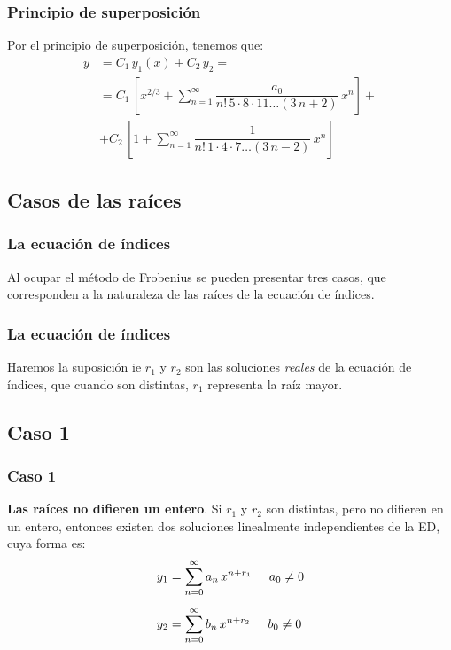 \begin{frame}
\frametitle{Principio de superposición}
Por el principio de superposición, tenemos que:
\begin{align*}
y &= C_{1} \, y_{1} (x) + C_{2} \, y_{2} = \\[0.5em]
&= C_{1} \, \left[ x^{2/3} + \sum_{n=1}^{\infty} \dfrac{a_{0}}{n! \, 5 \cdot 8 \cdot 11 \ldots (3\, n + 2)} \, x^{n} \right] + \\[0.5em]
&+ C_{2} \, \left[ 1 + \sum_{n=1}^{\infty} \dfrac{1}{n! \, 1 \cdot 4 \cdot 7 \ldots (3\, n - 2)} \, x^{n} \right]
\end{align*}
\end{frame}
\subsection{Casos de las raíces}
\begin{frame}
\frametitle{La ecuación de índices}
Al ocupar el método de Frobenius se pueden presentar tres casos, que corresponden a la naturaleza de las raíces de la ecuación de índices.
\end{frame}
\begin{frame}
\frametitle{La ecuación de índices}
Haremos la suposición ie $r_{1}$ y $r_{2}$ son las soluciones \emph{reales} de la ecuación de índices, que cuando son distintas, $r_{1}$ representa la raíz mayor.
\end{frame}
\subsection*{Caso 1}
\begin{frame}
\frametitle{Caso 1}
\textbf{Las raíces no difieren un entero}. Si $r_{1}$ y $r_{2}$ son distintas, pero no difieren  en un entero, entonces existen dos soluciones linealmente independientes de la ED, cuya forma es:
\begin{subequations}
\begin{align}
y_{1} &= \sum_{n=0}^{\infty} a_{n} \, x^{n+r_{1}} \hspace{0.5cm} a_{0} \neq 0 \label{eq:ecuacion_14a} \\[0.5em]
y_{2} &= \sum_{n=0}^{\infty} b_{n} \, x^{n+r_{2}} \hspace{0.5cm} b_{0} \neq 0 \label{eq:ecuacion_14b}
\end{align}
\end{subequations}
\end{frame}

